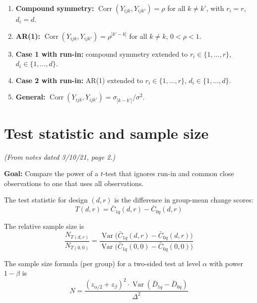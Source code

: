 \documentclass[11pt]{article}
\DeclareMathOperator{\Var}{Var}
\DeclareMathOperator{\Corr}{Corr}
\begin{document}
\begin{enumerate}
  \item \textbf{Compound symmetry:}
    $\Corr(Y_{ijk}, Y_{ijk'}) = \rho$ for all $k \ne k'$,
    with $r_i = r$, $d_i = d$.

  \item \textbf{AR(1):}
    $\Corr(Y_{ijk}, Y_{ijk'}) = \rho^{|k'-k|}$
    for all $k \ne k$, $0 < \rho < 1$.

  \item \textbf{Case 1 with run-in:}
    compound symmetry extended to $r_i \in \{1,\ldots,r\}$,
    $d_i \in \{1,\ldots,d\}$.

  \item \textbf{Case 2 with run-in:}
    AR(1) extended to $r_i \in \{1,\ldots,r\}$,
    $d_i \in \{1,\ldots,d\}$.

  \item \textbf{General:}
    $\Corr(Y_{ijk}, Y_{ijk'}) = \sigma_{|k-k'|} / \sigma^2$.
\end{enumerate}


\section{Test statistic and sample size}
\label{sec:test}

\noindent
\textit{(From notes dated 3/10/21, page 2.)}

\medskip
\noindent
\textbf{Goal:} Compare the power of a $t$-test that ignores
run-in and common close observations to one that uses all
observations.

The test statistic for design $(d, r)$ is the difference
in group-mean change scores:
\begin{equation}
  T(d, r) = \bar{C}_{1q}(d, r) - \bar{C}_{0q}(d, r)
\end{equation}

The relative sample size is
\begin{equation}
  \frac{N_{T(d,r)}}{N_{T(0,0)}}
  = \frac{\Var\bigl(\bar{C}_{1q}(d,r)
    - \bar{C}_{0q}(d,r)\bigr)}
    {\Var\bigl(\bar{C}_{1q}(0,0)
    - \bar{C}_{0q}(0,0)\bigr)}
\end{equation}

The sample size formula (per group) for a two-sided test
at level $\alpha$ with power $1 - \beta$ is
\begin{equation}
  N = \frac{(z_{\alpha/2} + z_\beta)^2
    \cdot \Var(\bar{D}_{1q} - \bar{D}_{0q})}
    {\Delta^2}
  \label{eq:samplesize}
\end{equation}
\end{document}
